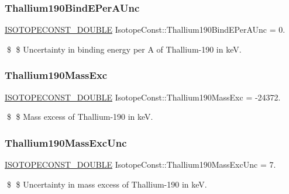 \subsubsection{\texorpdfstring{Thallium190\+Bind\+E\+Per\+A\+Unc}{Thallium190BindEPerAUnc}}
{\footnotesize\ttfamily \mbox{\hyperlink{group___isotope_const-_macros_ga8f45a7272ce02c0b4c65c44636ed719a}{I\+S\+O\+T\+O\+P\+E\+C\+O\+N\+S\+T\+\_\+\+D\+O\+U\+B\+LE}} Isotope\+Const\+::\+Thallium190\+Bind\+E\+Per\+A\+Unc = 0.}

\$ \$ Uncertainty in binding energy per A of Thallium-\/190 in keV. \mbox{\label{group___isotope_const-_thallium-_tl190_gae84a00ecd9ef4cd260e0e9ad923f2ff9}} 
\subsubsection{\texorpdfstring{Thallium190\+Mass\+Exc}{Thallium190MassExc}}
{\footnotesize\ttfamily \mbox{\hyperlink{group___isotope_const-_macros_ga8f45a7272ce02c0b4c65c44636ed719a}{I\+S\+O\+T\+O\+P\+E\+C\+O\+N\+S\+T\+\_\+\+D\+O\+U\+B\+LE}} Isotope\+Const\+::\+Thallium190\+Mass\+Exc = -\/24372.}

\$ \$ Mass excess of Thallium-\/190 in keV. \mbox{\label{group___isotope_const-_thallium-_tl190_ga2e0bad45316fe8e8c0117b7d8ca64468}} 
\subsubsection{\texorpdfstring{Thallium190\+Mass\+Exc\+Unc}{Thallium190MassExcUnc}}
{\footnotesize\ttfamily \mbox{\hyperlink{group___isotope_const-_macros_ga8f45a7272ce02c0b4c65c44636ed719a}{I\+S\+O\+T\+O\+P\+E\+C\+O\+N\+S\+T\+\_\+\+D\+O\+U\+B\+LE}} Isotope\+Const\+::\+Thallium190\+Mass\+Exc\+Unc = 7.}

\$ \$ Uncertainty in mass excess of Thallium-\/190 in keV. \mbox{\label{group___isotope_const-_thallium-_tl190_gad0a5700ef582d1f51baff6bc94146e4f}} 
